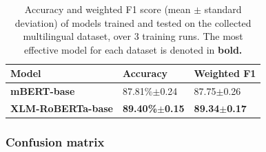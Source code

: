 \documentclass{l4proj}
\begin{document}
\begin{table}[]
\begin{tabular}{lll}
\hline
\textbf{Model}   & \textbf{Accuracy} & \textbf{Weighted F1} \\ \hline
\textbf{mBERT-base}       & 87.81\%$\pm$0.24     & 87.75$\pm$0.26        \\
\textbf{XLM-RoBERTa-base} & \textbf{89.40\%$\pm$0.15}     & \textbf{89.34$\pm$0.17}                 \\ \hline
\end{tabular}
\caption{Accuracy and weighted F1 score (mean $\pm$ standard deviation) of models trained and tested on the collected multilingual dataset, over 3 training runs. The most effective model for each dataset is denoted in \textbf{bold.}}
\label{table:realworld-effectiveness}
\end{table}

\subsubsection{Confusion matrix}
\end{document}
